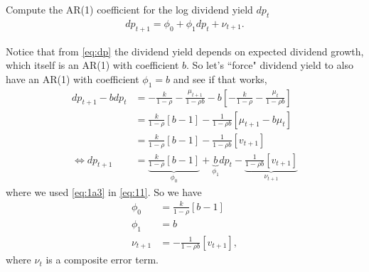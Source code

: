 \pagebreak
\begin{answer}[Part c]
Compute the AR(1) coefficient for the log dividend yield $dp_t$
\begin{align}
    dp_{t+1} = \phi_0 + \phi_1 dp_t + \nu_{t+1}. \label{eq:1c}
\end{align}
\end{answer}
Notice that from \eqref{eq:dp} the dividend yield depends on expected dividend growth, which itself is an AR(1) with coefficient $b$. So let's ``force" dividend yield to also have an AR(1) with coefficient $\phi_1=b$ and see if that works,
\begin{align}
    dp_{t+1} - bdp_t &= -\frac{k}{1-\rho} - \frac{\mu_{t+1}}{1-\rho b} - b\left[ -\frac{k}{1-\rho} - \frac{\mu_t}{1-\rho b} \right] \\
     &=  \frac{k}{1-\rho}  \left[ b-1 \right] - \frac{1}{1-\rho b} \left[ \mu_{t+1} - b\mu_t \right] \\
     &=  \frac{k}{1-\rho}  \left[ b-1 \right] - \frac{1}{1-\rho b} \left[ v_{t+1} \right] \label{eq:11}\\
     \iff dp_{t+1} &= \underset{\phi_0}{\underbrace{\frac{k}{1-\rho}  \left[ b-1 \right]}} + \underset{\phi_1}{\underbrace{b}}dp_t - \underset{\nu_{t+1}}{\underbrace{\frac{1}{1-\rho b} \left[ v_{t+1} \right]}} \label{eq:dpnew}
\end{align}
where we used \eqref{eq:1a3} in \eqref{eq:11}. So we have
\begin{align}
    \phi_0 &= \frac{k}{1-\rho} \left[ b-1 \right] \\
    \phi_1 &= b \\
    \nu_{t+1} &= -\frac{1}{1-\rho b} \left[v_{t+1} \right],
\end{align}
where $\nu_t$ is a composite error term.

